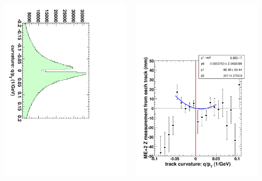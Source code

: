 \documentclass[compress]{beamer}
\begin{document}
\begin{frame}
\begin{columns}
\includegraphics[height=\linewidth, angle=90]{qoverpt.pdf}

\vfill
\includegraphics[width=\linewidth]{extrapolation_to_infinite_momentum.pdf}
\end{columns}
\end{frame}
\end{document}
